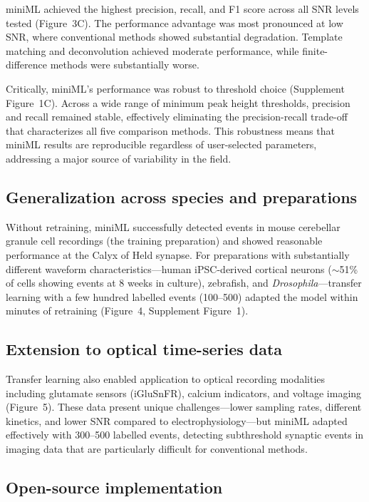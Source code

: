 \documentclass[11pt]{article}
\begin{document}
miniML achieved the highest precision, recall, and F1 score across all SNR levels tested (Figure~3C). The performance advantage was most pronounced at low SNR, where conventional methods showed substantial degradation. Template matching and deconvolution achieved moderate performance, while finite-difference methods were substantially worse.

Critically, miniML's performance was robust to threshold choice (Supplement Figure~1C). Across a wide range of minimum peak height thresholds, precision and recall remained stable, effectively eliminating the precision-recall trade-off that characterizes all five comparison methods. This robustness means that miniML results are reproducible regardless of user-selected parameters, addressing a major source of variability in the field.

\subsection{Generalization across species and preparations}

Without retraining, miniML successfully detected events in mouse cerebellar granule cell recordings (the training preparation) and showed reasonable performance at the Calyx of Held synapse. For preparations with substantially different waveform characteristics---human iPSC-derived cortical neurons ($\sim$51\% of cells showing events at 8 weeks in culture), zebrafish, and \textit{Drosophila}---transfer learning with a few hundred labelled events (100--500) adapted the model within minutes of retraining (Figure~4, Supplement Figure~1).

\subsection{Extension to optical time-series data}

Transfer learning also enabled application to optical recording modalities including glutamate sensors (iGluSnFR), calcium indicators, and voltage imaging (Figure~5). These data present unique challenges---lower sampling rates, different kinetics, and lower SNR compared to electrophysiology---but miniML adapted effectively with 300--500 labelled events, detecting subthreshold synaptic events in imaging data that are particularly difficult for conventional methods.

\subsection{Open-source implementation}
\end{document}
